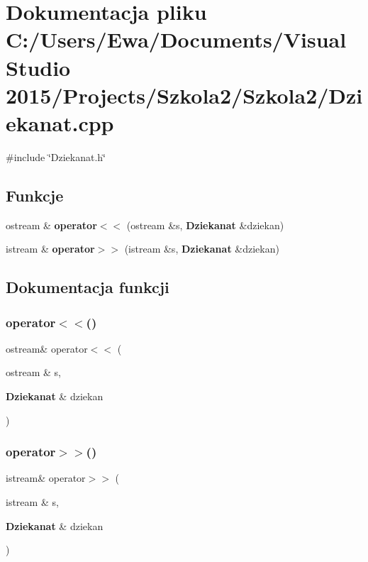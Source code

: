 \section{Dokumentacja pliku C\+:/\+Users/\+Ewa/\+Documents/\+Visual Studio 2015/\+Projects/\+Szkola2/\+Szkola2/\+Dziekanat.cpp}
\label{_dziekanat_8cpp}
{\ttfamily \#include \char`\"{}Dziekanat.\+h\char`\"{}}\newline
\subsection*{Funkcje}
\begin{DoxyCompactItemize}
\item 
ostream \& \textbf{ operator$<$$<$} (ostream \&s, \textbf{ Dziekanat} \&dziekan)
\item 
istream \& \textbf{ operator$>$$>$} (istream \&s, \textbf{ Dziekanat} \&dziekan)
\end{DoxyCompactItemize}


\subsection{Dokumentacja funkcji}
\mbox{\label{_dziekanat_8cpp_a0d6451a933c737efc5a195237dc65f85}} 
\subsubsection{operator$<$$<$()}
{\footnotesize\ttfamily ostream\& operator$<$$<$ (\begin{DoxyParamCaption}\item[{ostream \&}]{s,  }\item[{\textbf{ Dziekanat} \&}]{dziekan }\end{DoxyParamCaption})}

\mbox{\label{_dziekanat_8cpp_a33efe536b328cfad09ba270b61bbd54e}} 
\subsubsection{operator$>$$>$()}
{\footnotesize\ttfamily istream\& operator$>$$>$ (\begin{DoxyParamCaption}\item[{istream \&}]{s,  }\item[{\textbf{ Dziekanat} \&}]{dziekan }\end{DoxyParamCaption})}

